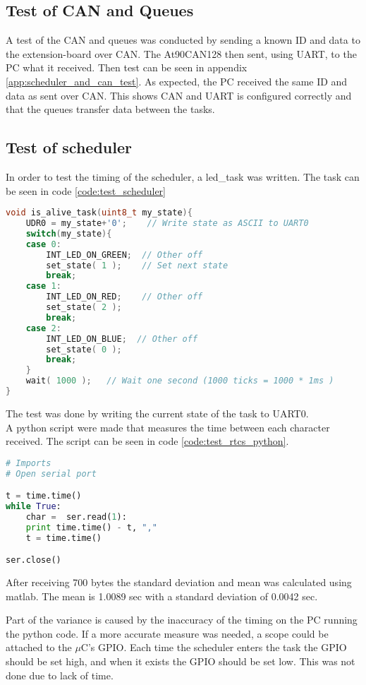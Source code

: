 \subsection*{Test of CAN and Queues}
A test of the CAN and queues was conducted by sending a known ID and data to the extension-board over \ac{CAN}. The At90CAN128 then sent, using UART, to the PC what it received. Then test can be seen in appendix \ref{app:scheduler_and_can_test}.
As expected, the PC received the same ID and data as sent over CAN. This shows CAN and UART is configured correctly and that the queues transfer data between the tasks.
\subsection*{Test of scheduler}
%
In order to test the timing of the scheduler, a led\_task was written. The task can be seen in code \ref{code:test_scheduler}
\begin{lstlisting}[language = c, caption = RTCS task used in timing test. It sends the state of the task as ASCII character to UART0 and waits 1000 ticks., label=code:test_scheduler]
void is_alive_task(uint8_t my_state){
	UDR0 = my_state+'0'; 	// Write state as ASCII to UART0
	switch(my_state){
	case 0:
		INT_LED_ON_GREEN;  // Other off
	    set_state( 1 );    // Set next state
		break;
	case 1:
		INT_LED_ON_RED;    // Other off
	    set_state( 2 );
		break;
	case 2:
		INT_LED_ON_BLUE;  // Other off
	    set_state( 0 );
		break;
	}
	wait( 1000 ); 	// Wait one second (1000 ticks = 1000 * 1ms )
}
\end{lstlisting}

The test was done by writing the current state of the task to UART0.\\ A python script were made that measures the time between each character received. The script can be seen in code \ref{code:test_rtcs_python}.
\begin{lstlisting}[language = python, caption = Python code used to measure time between received byte, label=code:test_rtcs_python]
# Imports
# Open serial port

t = time.time()
while True:
    char =  ser.read(1):
    print time.time() - t, ","
    t = time.time()

ser.close()
\end{lstlisting}
After receiving 700 bytes the standard deviation and mean was calculated using matlab.
The mean is 1.0089 sec with a standard deviation of 0.0042 sec.

Part of the variance is caused by the inaccuracy of the timing on the PC running the python code. If a more accurate measure was needed, a scope could be attached to the $\mu$C's GPIO. Each time the scheduler enters the task the GPIO should be set high, and when it exists the GPIO should be set low. This was not done due to lack of time.




